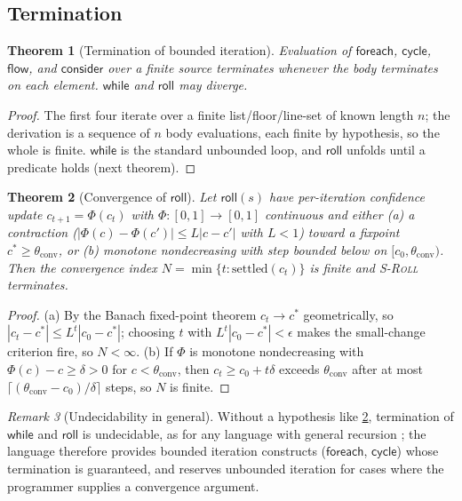 \documentclass[11pt,a4paper]{article}
\theoremstyle{plain}
\newtheorem{theorem}{Theorem}[section]
\theoremstyle{definition}
\theoremstyle{remark}
\newtheorem{remark}[theorem]{Remark}
\newcommand{\rn}[1]{\textsc{#1}}                          %
\newcommand{\Unit}{[0,1]}
\begin{document}
\subsection{Termination}

\begin{theorem}[Termination of bounded iteration]
\label{thm:termbounded}
Evaluation of $\mathsf{foreach}$, $\mathsf{cycle}$, $\mathsf{flow}$, and
$\mathsf{consider}$ over a finite source terminates whenever the body
terminates on each element. $\mathsf{while}$ and $\mathsf{roll}$ may diverge.
\end{theorem}
\begin{proof}
The first four iterate over a finite list/floor/line-set of known length $n$;
the derivation is a sequence of $n$ body evaluations, each finite by hypothesis,
so the whole is finite. $\mathsf{while}$ is the standard unbounded loop, and
$\mathsf{roll}$ unfolds until a predicate holds (next theorem).
\end{proof}

\begin{theorem}[Convergence of \texorpdfstring{$\mathsf{roll}$}{roll}]
\label{thm:rollconv}
Let $\mathsf{roll}(s)$ have per-iteration confidence update $c_{t+1}=\Phi(c_t)$
with $\Phi\colon\Unit\to\Unit$ continuous and either (a) a contraction
($|\Phi(c)-\Phi(c')|\le L|c-c'|$ with $L<1$) toward a fixpoint $c^\ast\ge
\theta_{\mathrm{conv}}$, or (b) monotone nondecreasing with step bounded below
on $[c_0,\theta_{\mathrm{conv}})$. Then the convergence index
$N=\min\{t:\mathrm{settled}(c_t)\}$ is finite and \rn{S-Roll} terminates.
\end{theorem}
\begin{proof}
(a) By the Banach fixed-point theorem $c_t\to c^\ast$ geometrically, so
$|c_t-c^\ast|\le L^t|c_0-c^\ast|$; choosing $t$ with $L^t|c_0-c^\ast|<\epsilon$
makes the small-change criterion fire, so $N<\infty$. (b) If $\Phi$ is monotone
nondecreasing with $\Phi(c)-c\ge\delta>0$ for $c<\theta_{\mathrm{conv}}$, then
$c_t\ge c_0+t\delta$ exceeds $\theta_{\mathrm{conv}}$ after at most
$\lceil(\theta_{\mathrm{conv}}-c_0)/\delta\rceil$ steps, so $N$ is finite.
\end{proof}

\begin{remark}[Undecidability in general]
Without a hypothesis like \cref{thm:rollconv}, termination of $\mathsf{while}$
and $\mathsf{roll}$ is undecidable, as for any language with general recursion
\citep{hopcroft2006}; the language therefore provides bounded iteration
constructs ($\mathsf{foreach}$, $\mathsf{cycle}$) whose termination is
guaranteed, and reserves unbounded iteration for cases where the programmer
supplies a convergence argument.
\end{remark}
\end{document}
